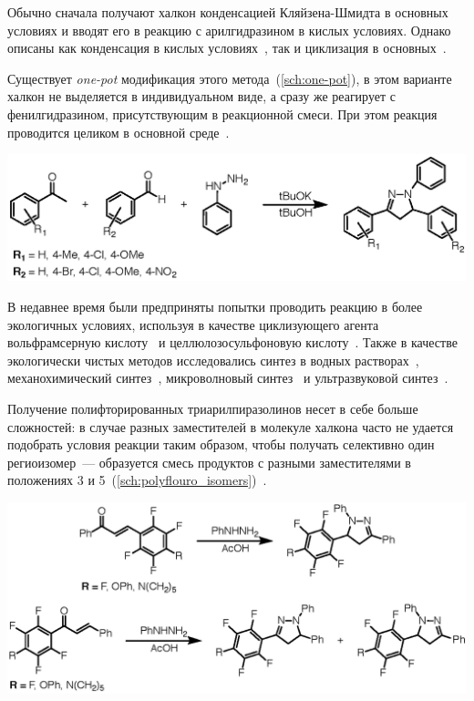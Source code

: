 Обычно сначала получают халкон конденсацией Кляйзена-Шмидта в основных условиях и вводят его в реакцию с арилгидразином в кислых условиях.
Однако описаны как конденсация в кислых условиях~\cite{Wang2010, Nielsen}, так и циклизация в основных~\cite{Munawar2008, Neudorfer2014, Manyem2007, Patel2004, Singh2014}.

Существует \emph{one-pot} модификация этого метода~(\ref{sch:one-pot}), в этом варианте халкон не выделяется в индивидуальном виде, а сразу же реагирует с фенилгидразином, присутствующим в реакционной смеси.
При этом реакция проводится целиком в основной среде~\cite{Farooq2020}.

\begin{scheme}[h!]
    \centering
    \includegraphics{sections/literature/img/one-pot.eps}
    \caption{}
    \label{sch:one-pot}
\end{scheme}

В недавнее время были предприняты попытки проводить реакцию в более экологичных условиях, используя в качестве циклизующего агента вольфрамсерную кислоту~\cite{Rahmatzadeh2015} и целлюлозосульфоновую кислоту~\cite{Daneshfar2015}.
Также в качестве экологически чистых методов исследовались синтез в водных растворах~\cite{Markovic2015}, механохимический синтез~\cite{Zangade2013}, микроволновый синтез~\cite{Adhikari2012} и ультразвуковой синтез~\cite{Shelke2012}.

Получение полифторированных триарилпиразолинов несет в себе больше сложностей: в случае разных заместителей в молекуле халкона часто не удается подобрать условия реакции таким образом, чтобы получать селективно один региоизомер~--- образуется смесь продуктов с разными заместителями в положениях 3 и 5~(\ref{sch:polyflouro_isomers})~\cite{2010}.

\begin{scheme}[h!]
    \centering
    \includegraphics{sections/literature/img/polyflouro_isomers.eps}
    \caption{}
    \label{sch:polyflouro_isomers}
\end{scheme}

